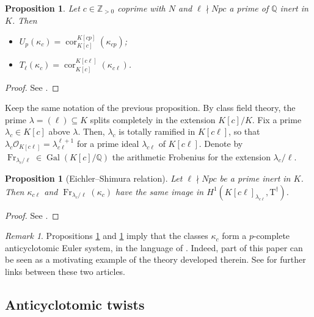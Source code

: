 \documentclass[12pt,reqno]{amsart}
\newtheorem{proposition}[theorem]{Proposition}
\theoremstyle{definition}
\theoremstyle{remark}
\newtheorem{remark}[theorem]{Remark}
\newcommand{\numberset}{\mathbb}
\newcommand{\Q}{\numberset{Q}}
\newcommand{\Z}{\numberset{Z}}
\newcommand{\T}{\boldsymbol{\mathrm{T}}}
\DeclareMathOperator{\Gal}{Gal}
\DeclareMathOperator{\Cor}{cor}
\DeclareMathOperator{\Fr}{Fr}
\newcommand{\gl}{\lambda}
\begin{document}
\begin{proposition}\label{prop:properties-big-Heegner-points}
    Let $c\in\Z_{>0}$ coprime with $N$ and $\ell\nmid Npc$ a prime of $\Q$ inert in $K$. Then
    \begin{itemize}
        \item[(a)] $ U_p(\kappa_c)=\Cor_{K[c]}^{K[cp]}(\kappa_{cp})$;
        \item[(b)] $T_\ell(\kappa_c)=\Cor_{K[c]}^{K[c\ell]}(\kappa_{c\ell})$.
    \end{itemize}
\end{proposition}
\begin{proof}
    See \cite[Corollaries 8.2 and 8.4]{Longo-Vigni11:quaternion-algebras-Hida-families}.
\end{proof}

Keep the same notation of the previous proposition. By class field theory, the prime $\gl=(\ell)\subseteq K$ splits completely in the extension $K[c]/K$.  Fix a prime $\gl_c\in K[c]$ above $\gl$. Then, $\gl_c$ is totally ramified in $K[c\ell]$, so that $\gl_c\mathcal{O}_{K[c\ell]}=\gl_{c\ell}^{\ell+1}$ for a prime ideal $\gl_{c\ell}$ of $K[c\ell]$. Denote by $\Fr_{\gl_c/\ell}\in\Gal(K[c]/\Q)$ the arithmetic Frobenius for the extension $\gl_c/\ell$.

\begin{proposition}[Eichler--Shimura relation]\label{prop:Eichler-Shimura-relation-big-Heegner-points}
        Let $\ell\nmid Npc$ be a prime inert in $K$. Then $\kappa_{c\ell}$ and $\Fr_{\gl_c/\ell}(\kappa_c)$ have the same image in $H^1(K[c\ell]_{\gl_{c\ell}},\T^\dag)$.
\end{proposition}
\begin{proof}
    See \cite[Proposition 8.7]{Longo-Vigni11:quaternion-algebras-Hida-families}.
\end{proof}

\begin{remark}
    Propositions \ref{prop:properties-big-Heegner-points} and \ref{prop:Eichler-Shimura-relation-big-Heegner-points} imply that the classes $\kappa_c$ form a $p$-complete anticyclotomic Euler system, in the language of \cite{mastella-zerman2025:anticyclotomic}. Indeed, part of this paper can be seen as a motivating example of the theory developed therein. See \cite[§4.3]{mastella-zerman2025:anticyclotomic} for further links between these two articles.
\end{remark}

\subsection{Anticyclotomic twists}\label{sec:anticyclotomic-twists}
\end{document}
